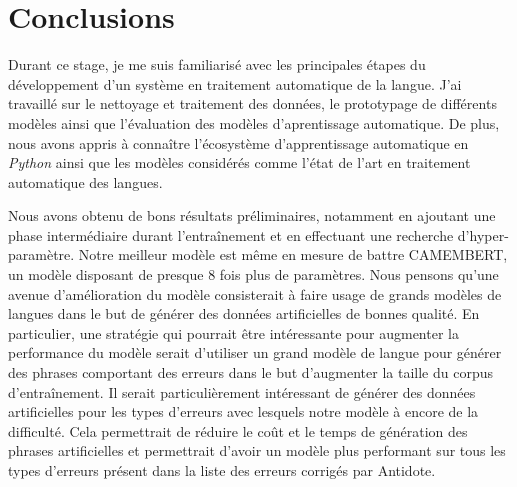 \documentclass[12pt,twoside,maitrise]{dms}
\theoremstyle{definition}
\numberwithin{equation}{section}
\numberwithin{table}{chapter}
\numberwithin{figure}{chapter}
\begin{document}
\chapter{Conclusions}
Durant ce stage, je me suis familiarisé avec les principales étapes du
développement d'un système en traitement automatique de la langue. J'ai
travaillé sur le nettoyage et traitement des données, le prototypage de
différents modèles ainsi que l'évaluation des modèles d'aprentissage
automatique. De plus, nous avons appris à connaître l'écosystème
d'apprentissage automatique en \textit{Python} ainsi que les modèles considérés
comme l'état de l'art en traitement automatique des langues.

Nous avons obtenu de bons résultats préliminaires, notamment en ajoutant une
phase intermédiaire durant l'entraînement et en effectuant une recherche
d'hyper-paramètre. Notre meilleur modèle est même en mesure de battre
CAMEMBERT, un modèle disposant de presque 8 fois plus de paramètres. Nous
pensons qu'une avenue d'amélioration du modèle consisterait à faire usage de
grands modèles de langues dans le but de générer des données artificielles de
bonnes qualité. En particulier, une stratégie qui pourrait être intéressante
pour augmenter la performance du modèle serait d'utiliser un grand modèle de
langue pour générer des phrases comportant des erreurs dans le but d'augmenter
la taille du corpus d'entraînement. Il serait particulièrement intéressant de
générer des données artificielles pour les types d'erreurs avec lesquels notre
modèle à encore de la difficulté. Cela permettrait de réduire le coût et le
temps de génération des phrases artificielles et permettrait d'avoir un modèle
plus performant sur tous les types d'erreurs présent dans la liste des erreurs
corrigés par Antidote.



\end{document}
